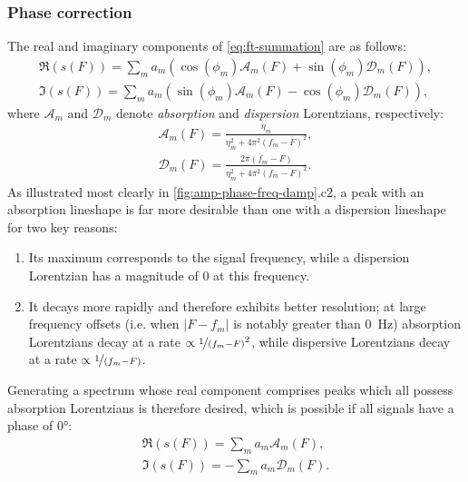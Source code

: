 \subsubsection{Phase correction}
The real and imaginary components of \cref{eq:ft-summation} are as follows:
\begin{subequations}
    \begin{gather}
        \Re(s(F)) = \sum_m
        a_m (\cos(\phi_m) \mathcal{A}_m(F) + \sin(\phi_m) \mathcal{D}_m(F)),\\
        \Im(s(F)) = \sum_m
        a_m (\sin(\phi_m) \mathcal{A}_m(F) - \cos(\phi_m) \mathcal{D}_m(F)),
    \end{gather}
\end{subequations}
where $\mathcal{A}_m$ and  $\mathcal{D}_m$ denote \emph{absorption} and
\emph{dispersion} Lorentzians, respectively:
\begin{subequations}
    \begin{gather}
        \mathcal{A}_m(F) = \frac{\eta_m}{\eta_m^2 + 4 \pi^2 (f_m - F)^2},\\
        \mathcal{D}_m(F) = \frac{2 \pi (f_m - F)}{\eta_m^2 + 4 \pi^2 (f_m - F)^2}.
    \end{gather}
\end{subequations}
As illustrated most clearly in \cref{fig:amp-phase-freq-damp}.c2, a peak with
an absorption lineshape is far more desirable than one with a dispersion
lineshape for two key reasons:
\begin{enumerate}
    \item Its maximum corresponds to the signal frequency, while a dispersion
        Lorentzian has a magnitude of $0$ at this frequency.
    \item It decays more rapidly and therefore exhibits better resolution;
        at large frequency offsets (i.e. when $\lvert F - f_m \rvert$ is
        notably greater than \qty{0}{\hertz}) absorption Lorentzians decay at
        a rate $\propto \nicefrac{1}{(f_m - F)}^2$, while dispersive
        Lorentzians decay at a rate $\propto \nicefrac{1}{(f_m - F)}$.
\end{enumerate}
Generating a spectrum whose real component comprises peaks which all possess
absorption Lorentzians is therefore desired, which is possible if all signals
have a phase of \ang{0}:
\begin{subequations}
    \begin{gather}
        \Re(s(F)) = \sum_m a_m \mathcal{A}_m(F),\label{eq:absorption}\\
        \Im(s(F)) = -\sum_m a_m \mathcal{D}_m(F).\label{eq:dispersion}
    \end{gather}
\end{subequations}
